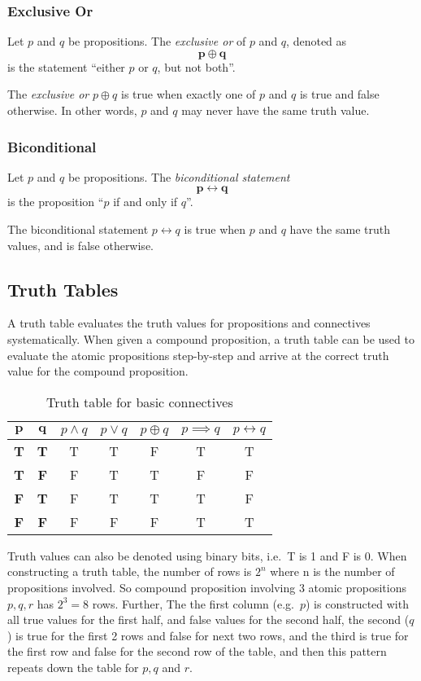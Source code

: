 \subsubsection{Exclusive Or}

Let \(p\) and \(q\) be propositions. The \emph{exclusive or} of \(p\) and \(q\), denoted as \[ \mathbf{p \oplus q }\] is the statement ``either \(p\) or \(q\), but not both''.

The \emph{exclusive or} \(p \oplus q\) is true when exactly one of \(p\) and \(q\) is true and false otherwise. In other words, \( p \) and \( q \) may never have the same truth value.  

\subsubsection{Biconditional}
Let \(p\) and \(q\) be propositions. The \emph{biconditional statement} \[ \mathbf{p \leftrightarrow q } \] is the proposition ``\(p\) if and only if \(q\)''.

The biconditional statement \(p \leftrightarrow q\) is true when \(p\) and \(q\) have the same truth values, and is false otherwise.

\subsection{Truth Tables}
A truth table evaluates the truth values for propositions and connectives systematically. When given a compound proposition, a truth table can be used to evaluate the atomic propositions step-by-step and arrive at the correct truth value for the compound proposition.

\begin{table}[H]
\centering
\caption{Truth table for basic connectives}\label{tab:truth}
\begin{tabular}{@{}>{\bfseries}c>{\bfseries}cccccc@{}}
\toprule
 \( \mathbf{p} \) & \( \mathbf{q} \) & \(p \wedge q\) & \(p \vee q\) & \(p \oplus q\) & \(p \implies q\) & \(p \leftrightarrow q\)  \\ \midrule
 T & T & T & T & F & T & T \\
 T & F & F & T & T & F & F \\
 F & T & F & T & T & T & F \\
 F & F & F & F & F & T & T \\
  \bottomrule
\end{tabular}
\end{table}
Truth values can also be denoted using binary bits, i.e.~T is 1 and F is 0. When constructing a truth table, the number of rows is \(2^n\) where n is the number of propositions involved. So compound proposition involving 3 atomic propositions \(p, q, r\) has \(2^3 = 8\) rows.
Further, The the first column (e.g.~\(p\)) is constructed with all true values for the first half, and false values for the second half, the second (\(q\)) is true for the first 2 rows and false for next two rows, and the third is true for the first row and false for the second row of the table, and then this pattern repeats down the table for \(p, q\) and \(r\).

